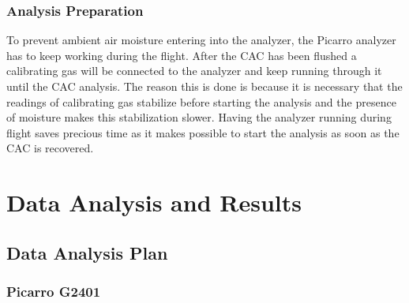\documentclass[a4paper,12pt,twoside]{article}
\begin{document}


\subsubsection{Analysis Preparation}

To prevent ambient air moisture entering into the analyzer, the Picarro analyzer has to keep working during the flight. After the CAC has been flushed a calibrating gas will be connected to the analyzer and keep running through it until the CAC analysis. 
The reason this is done is because it is necessary that the readings of calibrating gas stabilize before starting the analysis and the presence of moisture makes this stabilization slower. Having the analyzer running during flight saves precious time as it makes possible to start the analysis as soon as the CAC is recovered. 






\pagebreak
\section{Data Analysis and Results}

\subsection{Data Analysis Plan}

\subsubsection{Picarro G2401}
\end{document}
